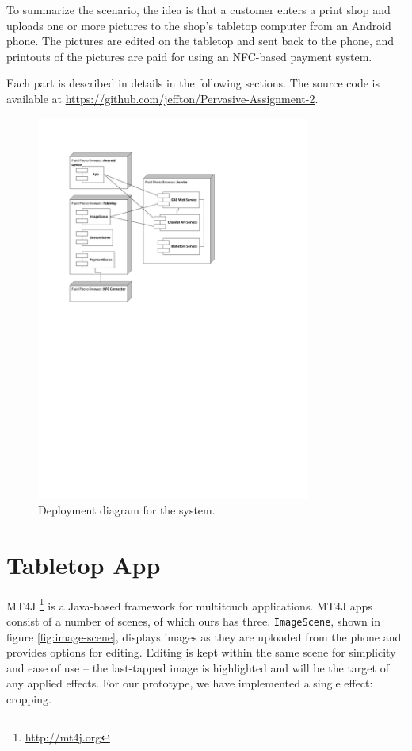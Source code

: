 \documentclass{article}
\begin{document}
To summarize the scenario, the idea is that a customer enters a print shop and uploads one or more pictures to the shop's tabletop computer from an Android phone. The pictures are edited on the tabletop and sent back to the phone, and printouts of the pictures are paid for using an NFC-based payment system.
 
Each part is described in details in the following sections. The source code is available at \url{https://github.com/jeffton/Pervasive-Assignment-2}.
 
\begin{figure}[t]
                         	\begin{center}
                                                      	\includegraphics[width=0.8\textwidth]{deployment-diagram-fluit-photo-browser.pdf}
                         	\end{center}
                         	\caption{Deployment diagram for the system.}
                         	\label{fig:deployment-diagram}
\end{figure}
 
\section{Tabletop App}
MT4J \footnote{\url{http://mt4j.org}} is a Java-based framework for multitouch applications. MT4J apps consist of a number of scenes, of which ours has three. \lstinline{ImageScene}, shown in figure \ref{fig:image-scene}, displays images as they are uploaded from the phone and provides options for editing. Editing is kept within the same scene for simplicity and ease of use -- the last-tapped image is highlighted and will be the target of any applied effects. For our prototype, we have implemented a single effect: cropping.
 
\end{document}

